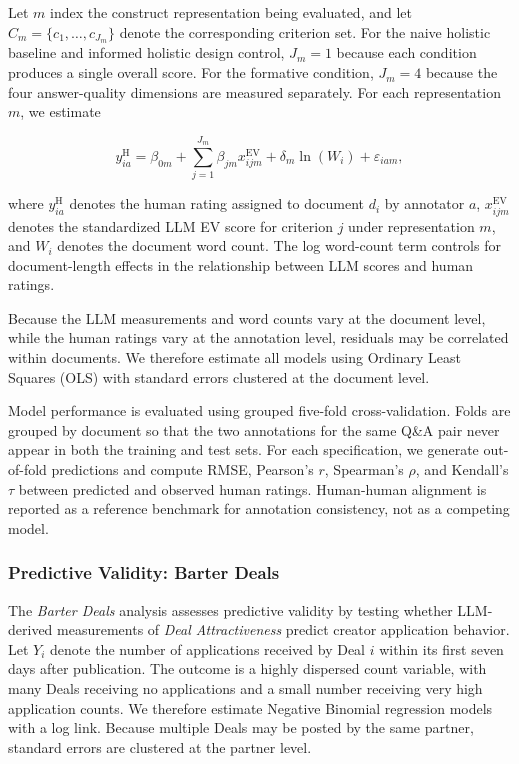 Let $m$ index the construct representation being evaluated, and let $C_m = \{c_1,\ldots,c_{J_m}\}$ denote the corresponding criterion set. For the naive holistic baseline and informed holistic design control, $J_m=1$ because each condition produces a single overall score. For the formative condition, $J_m=4$ because the four answer-quality dimensions are measured separately. For each representation $m$, we estimate

\begin{equation}\label{eq:feedbackqa_regression}
    y^{\mathrm{H}}_{ia}
    =
    \beta_{0m}
    +
    \sum_{j=1}^{J_m}
    \beta_{jm} x^{\mathrm{EV}}_{ijm}
    +
    \delta_m \ln(W_i)
    +
    \varepsilon_{iam},
\end{equation}

where $y^{\mathrm{H}}_{ia}$ denotes the human rating assigned to document $d_i$ by annotator $a$, $x^{\mathrm{EV}}_{ijm}$ denotes the standardized LLM EV score for criterion $j$ under representation $m$, and $W_i$ denotes the document word count. The log word-count term controls for document-length effects in the relationship between LLM scores and human ratings.

Because the LLM measurements and word counts vary at the document level, while the human ratings vary at the annotation level, residuals may be correlated within documents. We therefore estimate all models using Ordinary Least Squares (OLS) with standard errors clustered at the document level.

Model performance is evaluated using grouped five-fold cross-validation. Folds are grouped by document so that the two annotations for the same Q\&A pair never appear in both the training and test sets. For each specification, we generate out-of-fold predictions and compute RMSE, Pearson's $r$, Spearman's $\rho$, and Kendall's $\tau$ between predicted and observed human ratings. Human-human alignment is reported as a reference benchmark for annotation consistency, not as a competing model.



\subsubsection{Predictive Validity: Barter Deals}\label{sec:methods_barter}

The \textit{Barter Deals} analysis assesses predictive validity by testing whether LLM-derived measurements of \textit{Deal Attractiveness} predict creator application behavior. Let $Y_i$ denote the number of applications received by Deal $i$ within its first seven days after publication. The outcome is a highly dispersed count variable, with many Deals receiving no applications and a small number receiving very high application counts. We therefore estimate Negative Binomial regression models with a log link. Because multiple Deals may be posted by the same partner, standard errors are clustered at the partner level.

